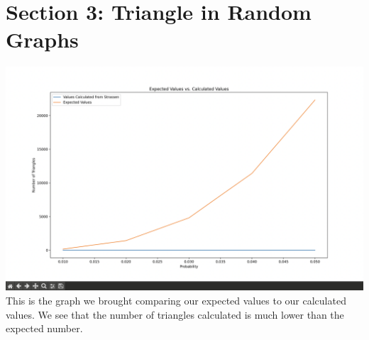\documentclass{article}
\begin{document}
\section{Section 3: Triangle in Random Graphs}
\includegraphics[width=\textwidth]{Triangles.png}
This is the graph we brought comparing our expected values to our calculated values. We see that the number of triangles calculated is much lower than the expected number.
\end{document}
